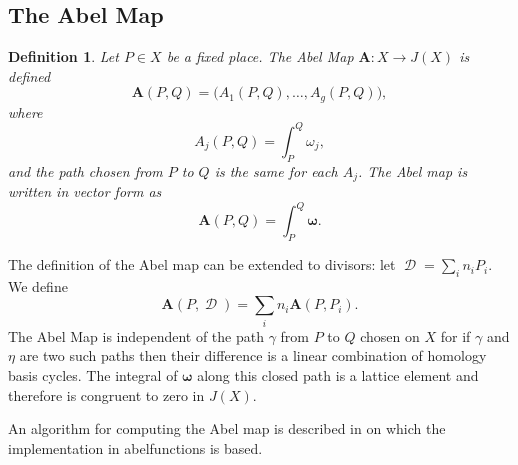 \documentclass[12pt]{article}
\newtheorem{definition}[theorem]{Definition}
\theoremstyle{definition}
\DeclareMathOperator{\DivD}{\mathcal{D}}
\begin{document}
\subsection{The Abel Map}

\begin{definition}\label{def:abelmap}
  Let $P \in X$ be a fixed place. The Abel Map $\boldsymbol{A} : X \to
  J(X)$ is defined
  \begin{equation} \label{eqn:abel1}
    \boldsymbol{A}(P,Q) = \big( A_1(P,Q), \ldots, A_g(P,Q) \big),
  \end{equation}
  where
  \begin{equation} \label{eqn:abel2}
    A_j(P,Q) = \int_P^Q \omega_j,
  \end{equation}
  and the path chosen from $P$ to $Q$ is the same for each $A_j$. The
  Abel map is written in vector form as
  \begin{equation} \label{eqn:abel-vector}
    \boldsymbol{A}(P,Q) = \int_P^Q \boldsymbol{\omega}.
  \end{equation}
\end{definition}
The definition of the Abel map can be extended to divisors: let $\DivD =
\sum_i n_i P_i$. We define
\begin{equation} \label{eqn:abel-divisors}
  \boldsymbol{A}(P,\DivD) = \sum_i n_i \boldsymbol{A}(P,P_i).
\end{equation}
The Abel Map is independent of the path $\gamma$ from $P$ to $Q$ chosen
on $X$ for if $\gamma$ and $\eta$ are two such paths then their
difference is a linear combination of homology basis cycles. The
integral of $\boldsymbol{\omega}$ along this closed path is a lattice
element and therefore is congruent to zero in $J(X)$.

An algorithm for computing the Abel map is described in
\cite{DeconinckPatterson11} on which the implementation in {\sc
  abelfunctions} is based.
\end{document}
